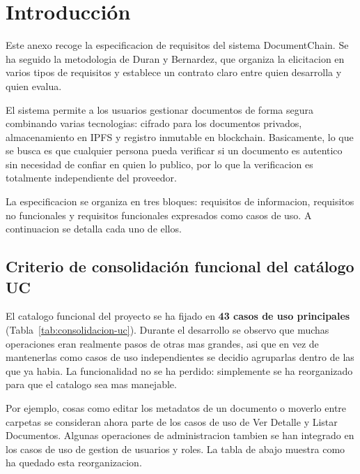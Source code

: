 \documentclass[11pt, a4paper]{article}
\begin{document}
\section{Introducción}

Este anexo recoge la especificacion de requisitos del sistema DocumentChain. Se ha seguido la metodologia de Duran y Bernardez, que organiza la elicitacion en varios tipos de requisitos y establece un contrato claro entre quien desarrolla y quien evalua.

El sistema permite a los usuarios gestionar documentos de forma segura combinando varias tecnologias: cifrado para los documentos privados, almacenamiento en IPFS y registro inmutable en blockchain. Basicamente, lo que se busca es que cualquier persona pueda verificar si un documento es autentico sin necesidad de confiar en quien lo publico, por lo que la verificacion es totalmente independiente del proveedor.

La especificacion se organiza en tres bloques: requisitos de informacion, requisitos no funcionales y requisitos funcionales expresados como casos de uso. A continuacion se detalla cada uno de ellos.

\subsection*{Criterio de consolidación funcional del catálogo UC}

El catalogo funcional del proyecto se ha fijado en \textbf{43 casos de uso principales} (Tabla~\ref{tab:consolidacion-uc}). Durante el desarrollo se observo que muchas operaciones eran realmente pasos de otras mas grandes, asi que en vez de mantenerlas como casos de uso independientes se decidio agruparlas dentro de las que ya habia. La funcionalidad no se ha perdido: simplemente se ha reorganizado para que el catalogo sea mas manejable.

Por ejemplo, cosas como editar los metadatos de un documento o moverlo entre carpetas se consideran ahora parte de los casos de uso de Ver Detalle y Listar Documentos. Algunas operaciones de administracion tambien se han integrado en los casos de uso de gestion de usuarios y roles. La tabla de abajo muestra como ha quedado esta reorganizacion.
\end{document}
